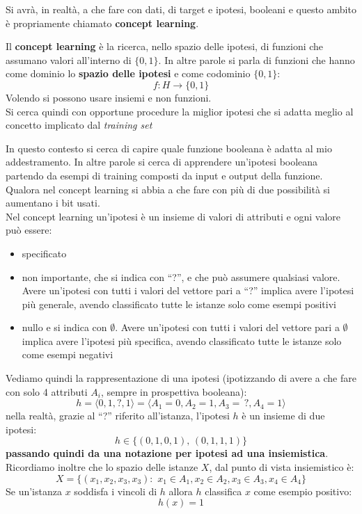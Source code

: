 \documentclass[a4paper,12pt, oneside]{book}
\begin{document}
Si avrà, in realtà, a che fare con dati, di target e ipotesi,
booleani e questo ambito è propriamente chiamato \textbf{concept learning}.
\begin{definizione}
  Il \textbf{concept learning} è la ricerca, nello spazio delle ipotesi, di
  funzioni che assumano valori all'interno di $\{0,1\}$. In altre parole si
  parla di funzioni che hanno come dominio lo \textbf{spazio delle ipotesi} e
  come codominio $\{0,1\}$:
  \[f:H\to\{0,1\}\]
  Volendo si possono usare insiemi e non funzioni.\\
  Si cerca quindi con opportune procedure la miglior ipotesi che si adatta
  meglio al concetto implicato dal \textit{training set}
\end{definizione}
In questo contesto si cerca di capire quale funzione booleana è adatta al mio
addestramento. In altre parole si cerca di apprendere un'ipotesi booleana
partendo da esempi di training composti da input e output della
funzione. Qualora nel concept learning si abbia a che fare con più di due 
possibilità si aumentano i bit usati.\\
Nel concept learning un'ipotesi è un insieme di valori di attributi e ogni
valore può essere:
\begin{itemize}
  \item specificato
  \item non importante, che si indica con ``?'', e che può assumere qualsiasi
  valore. Avere un'ipotesi con tutti i valori del vettore pari a ``?'' implica
  avere l'ipotesi più generale, avendo classificato tutte le istanze solo come
  esempi positivi 
  \item nullo e si indica con $\emptyset$. Avere un'ipotesi con tutti i valori
  del vettore pari a $\emptyset$ implica avere l'ipotesi più specifica, avendo
  classificato tutte le istanze solo come esempi negativi 
\end{itemize}
\begin{esempio}
  Vediamo quindi la rappresentazione di una ipotesi (ipotizzando di avere a che
  fare con solo 4 attributi $A_i$, sempre in prospettiva booleana):
  \[h=\langle 0, 1, ?, 1\rangle = \langle A_1=0, A_2=1, A_3=\,?, A_4=1\rangle\]
  nella realtà, grazie al ``?'' riferito all'istanza, l'ipotesi $h$ è un insieme
  di due ipotesi: 
  \[h\in\{(0, 1, 0, 1),\,(0, 1, 1, 1)\}\]
  \textbf{passando quindi da una notazione per ipotesi ad una insiemistica}.\\
  Ricordiamo inoltre che lo spazio delle istanze $X$, dal punto di vista
  insiemistico è:
  \[X=\{(x_1,x_2,x_3,x_3): \,\,x_1\in A_1,x_2\in A_2, x_3\in A_3, x_4\in A_4\}\]
  Se un'istanza $x$ soddisfa i vincoli di $h$ allora $h$ classifica $x$ come
  esempio positivo:
  \[h(x)=1\]
\end{esempio}
\end{document}
